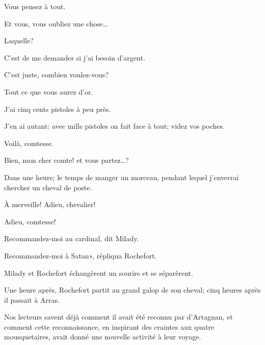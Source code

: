 \speak  Vous pensez à tout. 

\speak  Et vous, vous oubliez une chose\dots 

\speak  Laquelle? 

\speak  C'est de me demander si j'ai besoin d'argent. 

\speak  C'est juste, combien voulez-vous? 

\speak  Tout ce que vous aurez d'or. 

\speak  J'ai cinq cents pistoles à peu près. 

\speak  J'en ai autant: avec mille pistoles on fait face à tout; videz vos poches. 

\speak  Voilà, comtesse. 

\speak  Bien, mon cher comte! et vous partez\dots? 

\speak  Dans une heure; le temps de manger un morceau, pendant lequel j'enverrai chercher un cheval de poste. 

\speak  À merveille! Adieu, chevalier! 

\speak  Adieu, comtesse! 

\speak  Recommandez-moi au cardinal, dit Milady. 

\speak  Recommandez-moi à Satan», répliqua Rochefort. 

Milady et Rochefort échangèrent un sourire et se séparèrent. 

Une heure après, Rochefort partit au grand galop de son cheval; cinq heures après il passait à Arras. 

Nos lecteurs savent déjà comment il avait été reconnu par d'Artagnan, et comment cette reconnaissance, en inspirant des craintes aux quatre mousquetaires, avait donné une nouvelle activité à leur voyage. 
